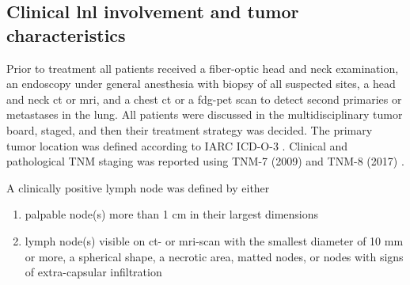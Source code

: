 \documentclass[\relativeRoot/main.tex]{subfiles}
\begin{document}
\subsection{Clinical \acrshort{lnl} involvement and tumor characteristics}
\label{subsec:dataset_clb:methods:involvement}

Prior to treatment all patients received a fiber-optic head and neck examination, an endoscopy under general anesthesia with biopsy of all suspected sites, a head and neck \gls{ct} or \gls{mri}, and a chest \gls{ct} or a \gls{fdg-pet} scan to detect second primaries or metastases in the lung. All patients were discussed in the multidisciplinary tumor board, staged, and then their treatment strategy was decided. The primary tumor location was defined according to IARC ICD-O-3 \cite{fritz_international_2000}. Clinical and pathological TNM staging was reported using TNM-7 (2009) and TNM-8 (2017) \cite{brierley_tnm_2017}.

A clinically positive lymph node was defined by either

\begin{enumerate}[label={\alph*)}]
    \item palpable node(s) more than 1 cm in their largest dimensions
    \item lymph node(s) visible on \gls{ct}- or \gls{mri}-scan with the smallest diameter of 10 mm or more, a spherical shape, a necrotic area, matted nodes, or nodes with signs of extra-capsular infiltration
\end{enumerate}
\end{document}

